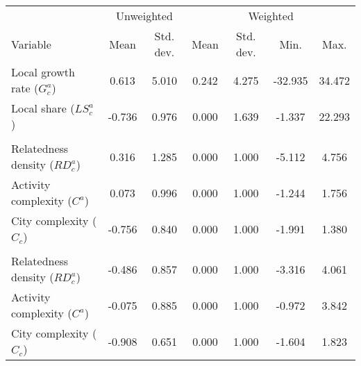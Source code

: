 
\begin{tabular}{lcccccc}
\toprule
\multicolumn{1}{c}{} & \multicolumn{2}{c}{Unweighted} & \multicolumn{4}{c}{Weighted} \\
\cmidrule(l{3pt}r{3pt}){2-3} \cmidrule(l{3pt}r{3pt}){4-7}
Variable & Mean & Std. dev. & Mean & Std. dev. & Min. & Max.\\
\midrule
Local growth rate ($G_c^a$) & 0.613 & 5.010 & 0.242 & 4.275 & -32.935 & 34.472\\
Local share ($LS_c^a$) & -0.736 & 0.976 & 0.000 & 1.639 & -1.337 & 22.293\\
\addlinespace[9.5pt]
\multicolumn{7}{l}{Davies and Mar\'e}\\
\hspace{1em}Relatedness density ($RD_c^a$) & 0.316 & 1.285 & 0.000 & 1.000 & -5.112 & 4.756\\
\hspace{1em}Activity complexity ($C^a$) & 0.073 & 0.996 & 0.000 & 1.000 & -1.244 & 1.756\\
\hspace{1em}City complexity ($C_c$) & -0.756 & 0.840 & 0.000 & 1.000 & -1.991 & 1.380\\
\addlinespace[9.5pt]
\multicolumn{7}{l}{EconGeo}\\
\hspace{1em}Relatedness density ($RD_c^a$) & -0.486 & 0.857 & 0.000 & 1.000 & -3.316 & 4.061\\
\hspace{1em}Activity complexity ($C^a$) & -0.075 & 0.885 & 0.000 & 1.000 & -0.972 & 3.842\\
\hspace{1em}City complexity ($C_c$) & -0.908 & 0.651 & 0.000 & 1.000 & -1.604 & 1.823\\
\bottomrule
\end{tabular}
